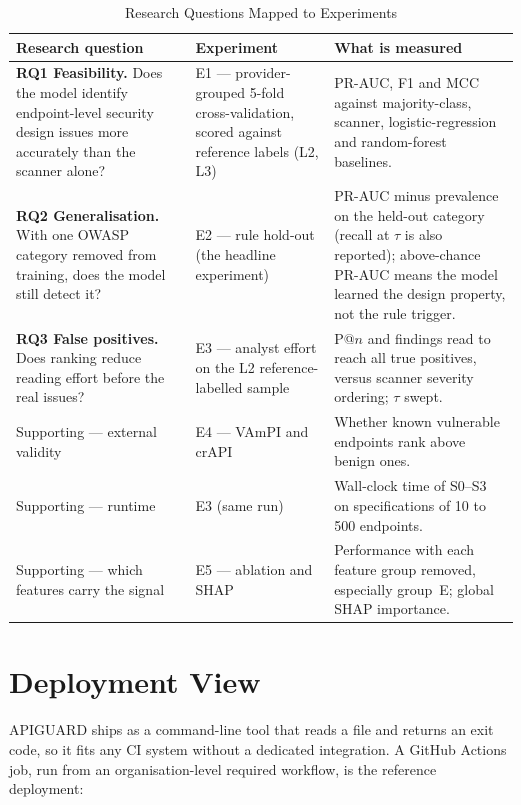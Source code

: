 \documentclass[conference]{IEEEtran}
\begin{document}
\begin{table}[!t]
\caption{Research Questions Mapped to Experiments}
\label{tab:validation}
\centering
\scriptsize
\begin{tabularx}{\columnwidth}{L{2.05cm} L{1.75cm} Y}
\toprule
\textbf{Research question} & \textbf{Experiment} & \textbf{What is measured}\\
\midrule
\textbf{RQ1 Feasibility.} Does the model identify endpoint-level security design issues more accurately than the scanner alone? & E1 --- provider-grouped 5-fold cross-validation, scored against reference labels (L2, L3) & PR-AUC, F1
and MCC against majority-class, scanner, logistic-regression and random-forest baselines.\\[2pt]
\textbf{RQ2 Generalisation.} With one OWASP category removed from training, does the model
still detect it? & E2 --- rule hold-out (the headline experiment) & PR-AUC minus prevalence on the held-out
category (recall at $\tau$ is also reported); above-chance PR-AUC means the model learned the design property, not the
rule trigger.\\[2pt]
\textbf{RQ3 False positives.} Does ranking reduce reading effort before the real issues? & E3
--- analyst effort on the L2 reference-labelled sample & P@$n$ and findings read to reach
all true positives, versus scanner severity ordering; $\tau$ swept.\\[2pt]
Supporting --- external validity & E4 --- VAmPI and crAPI & Whether known vulnerable endpoints
rank above benign ones.\\[2pt]
Supporting --- runtime & E3 (same run) & Wall-clock time of S0--S3 on specifications of 10 to 500
endpoints.\\[2pt]
Supporting --- which features carry the signal & E5 --- ablation and SHAP & Performance with
each feature group removed, especially group~E; global SHAP importance.\\
\bottomrule
\end{tabularx}
\end{table}

\section{Deployment View}
\label{sec:deploy}
APIGUARD ships as a command-line tool that reads a file and returns an exit code, so it fits
any CI system without a dedicated integration. A GitHub Actions job, run from an
organisation-level required workflow, is the reference deployment:
\end{document}
